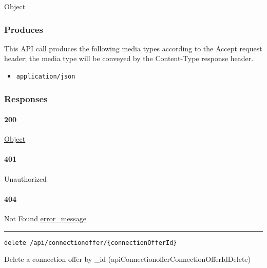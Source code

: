 Object

\hypertarget{produces-18}{%
\subsubsection{Produces}\label{produces-18}}

This API call produces the following media types according to the
{Accept} request header; the media type will be conveyed by the
{Content-Type} response header.

\begin{itemize}
\tightlist
\item
  \texttt{application/json}
\end{itemize}

\hypertarget{responses-18}{%
\subsubsection{Responses}\label{responses-18}}

\hypertarget{section-60}{%
\paragraph{200}\label{section-60}}

\protect\hyperlink{Object}{Object}

\hypertarget{section-61}{%
\paragraph{401}\label{section-61}}

Unauthorized \protect\hyperlink{}{}

\hypertarget{section-62}{%
\paragraph{404}\label{section-62}}

Not Found \protect\hyperlink{error_message}{error\_message}

\begin{center}\rule{0.5\linewidth}{\linethickness}\end{center}

\protect\hypertarget{apiConnectionofferConnectionOfferIdDelete}{}{}

\begin{verbatim}
delete /api/connectionoffer/{connectionOfferId}
\end{verbatim}

Delete a connection offer by \_id
({apiConnectionofferConnectionOfferIdDelete})

